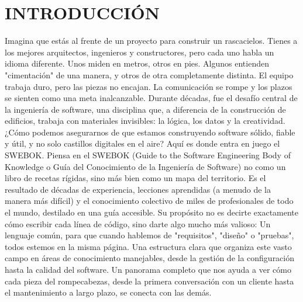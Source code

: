 \chapter*{INTRODUCCIÓN}
\label{cap:introduccion}

Imagina que estás al frente de un proyecto para construir un rascacielos. Tienes a los mejores arquitectos, ingenieros y constructores, pero cada uno habla un idioma diferente. Unos miden en metros, otros en pies. Algunos entienden "cimentación" de una manera, y otros de otra completamente distinta. El equipo trabaja duro, pero las piezas no encajan. La comunicación se rompe y los plazos se sienten como una meta inalcanzable.
Durante décadas, fue el desafío central de la ingeniería de software, una disciplina que, a diferencia de la construcción de edificios, trabaja con materiales invisibles: la lógica, los datos y la creatividad. ¿Cómo podemos asegurarnos de que estamos construyendo software sólido, fiable y útil, y no solo castillos digitales en el aire?
Aquí es donde entra en juego el SWEBOK. Piensa en el SWEBOK (Guide to the Software Engineering Body of Knowledge o Guía del Conocimiento de la Ingeniería de Software) no como un libro de recetas rígidas, sino más bien como un mapa del territorio. Es el resultado de décadas de experiencia, lecciones aprendidas (a menudo de la manera más difícil) y el conocimiento colectivo de miles de profesionales de todo el mundo, destilado en una guía accesible.
Su propósito no es decirte exactamente cómo escribir cada línea de código, sino darte algo mucho más valioso:
Un lenguaje común, para que cuando hablemos de "requisitos", "diseño" o "pruebas", todos estemos en la misma página.
Una estructura clara que organiza este vasto campo en áreas de conocimiento manejables, desde la gestión de la configuración hasta la calidad del software.
Un panorama completo que nos ayuda a ver cómo cada pieza del rompecabezas, desde la primera conversación con un cliente hasta el mantenimiento a largo plazo, se conecta con las demás.
